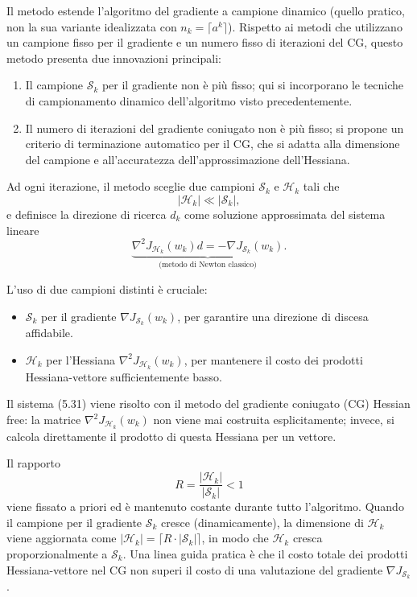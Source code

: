 \documentclass[italian, a4paper, twoside, binding=6mm]{sapthesis}
\begin{document}
Il metodo estende l'algoritmo del gradiente a campione dinamico (quello pratico, non la sua variante idealizzata con \(n_k = \lceil a^k \rceil\)). Rispetto ai metodi che utilizzano un campione fisso per il gradiente e un numero fisso di iterazioni del CG, questo metodo presenta due innovazioni principali:

\begin{enumerate}
    \item Il campione \(\mathcal{S}_k\) per il gradiente non è più fisso; qui si incorporano le tecniche di campionamento dinamico dell'algoritmo visto precedentemente.
    \item Il numero di iterazioni del gradiente coniugato non è più fisso; si propone un criterio di terminazione automatico per il CG, che si adatta alla dimensione del campione e all'accuratezza dell'approssimazione dell'Hessiana.
\end{enumerate}

Ad ogni iterazione, il metodo sceglie due campioni \(\mathcal{S}_k\) e \(\mathcal{H}_k\) tali che
\[
|\mathcal{H}_k| \ll |\mathcal{S}_k|,
\]
e definisce la direzione di ricerca \(d_k\) come soluzione approssimata del sistema lineare
\[
\underbrace{\nabla^2 J_{\mathcal{H}_k}(w_k) d = -\nabla J_{\mathcal{S}_k}(w_k)}_{\text{(metodo di Newton classico)}}. \tag{5.31}
\]

L'uso di due campioni distinti è cruciale:
\begin{itemize}
    \item \(\mathcal{S}_k\) per il gradiente \(\nabla J_{\mathcal{S}_k}(w_k)\), per garantire una direzione di discesa affidabile.
    \item \(\mathcal{H}_k\) per l'Hessiana \(\nabla^2 J_{\mathcal{H}_k}(w_k)\), per mantenere il costo dei prodotti Hessiana-vettore sufficientemente basso.
\end{itemize}

Il sistema (5.31) viene risolto con il metodo del gradiente coniugato (CG) Hessian free: la matrice \(\nabla^2 J_{\mathcal{H}_k}(w_k)\) non viene mai costruita esplicitamente; invece, si calcola direttamente il prodotto di questa Hessiana per un vettore.

Il rapporto
\[
R = \frac{|\mathcal{H}_k|}{|\mathcal{S}_k|} < 1 \tag{5.32}
\]
viene fissato a priori ed è mantenuto costante durante tutto l'algoritmo. Quando il campione per il gradiente \(\mathcal{S}_k\) cresce (dinamicamente), la dimensione di \(\mathcal{H}_k\) viene aggiornata come \(|\mathcal{H}_k| = \lceil R \cdot |\mathcal{S}_k|\rceil\), in modo che \(\mathcal{H}_k\) cresca proporzionalmente a \(\mathcal{S}_k\). Una linea guida pratica è che il costo totale dei prodotti Hessiana-vettore nel CG non superi il costo di una valutazione del gradiente \(\nabla J_{\mathcal{S}_k}\).
\end{document}
